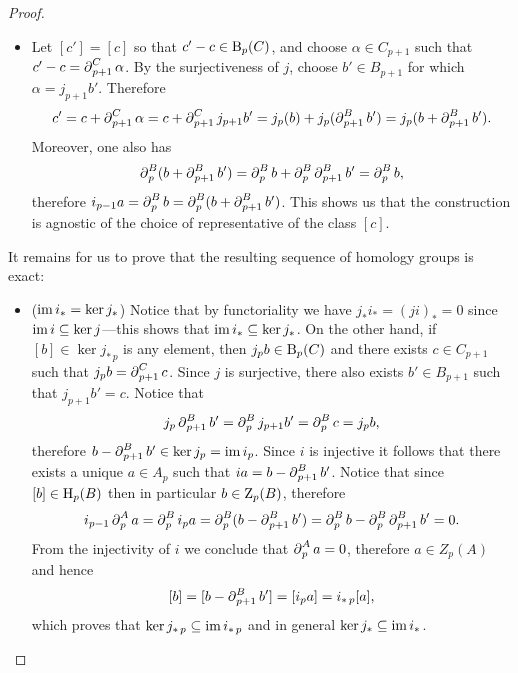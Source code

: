 \begin{proof}
\begin{itemize}
        \item Let \([c'] = [c]\) so that \(c' - c \in \operatorname{B}_p(C)\), and choose
              \(\alpha \in C_{p+1}\) such that \(c' - c = \operatorname{\partial}_{p+1}^C \alpha\). By the surjectiveness
              of \(j\), choose \(b' \in B_{p+1}\) for which \(\alpha = j_{p+1} b'\). Therefore
              \[
                  c' = c + \operatorname{\partial}_{p+1}^C \alpha = c + \operatorname{\partial}_{p+1}^C j_{p+1} b'
                  = j_p(b) + j_p(\operatorname{\partial}_{p+1}^B b')
                  = j_p(b + \operatorname{\partial}_{p+1}^B b').
              \]
              Moreover, one also has
              \[
                  \operatorname{\partial}_p^B(b + \operatorname{\partial}_{p+1}^B b')
                  = \operatorname{\partial}_p^B b + \operatorname{\partial}_p^B \operatorname{\partial}_{p+1}^B b'
                  = \operatorname{\partial}_p^{B} b,
              \]
              therefore \(i_{p-1} a = \operatorname{\partial}_p^B b = \operatorname{\partial}_p^B(b + \operatorname{\partial}_{p+1}^B b')\).  This
              shows us that the construction is agnostic of the choice of representative of
              the class \([c]\).
    \end{itemize}
    It remains for us to prove that the resulting sequence of homology groups is
    exact:
    \begin{itemize}\setlength\itemsep{0em}
        \item (\(\operatorname{im} i_{*} = \ker j_{*}\)) Notice that by functoriality we have
              \(j_{*} i_{*} = (j i)_{*} = 0\) since \(\operatorname{im} i \subseteq \ker j\)---this shows that
              \(\operatorname{im} i_{*} \subseteq \ker j_{*}\). On the other hand, if
              \([b] \in \ker j_{*\, p}\) is any element, then \(j_p b \in \operatorname{B}_p(C)\) and there
              exists \(c \in C_{p+1}\) such that \(j_p b = \operatorname{\partial}_{p+1}^C c\). Since \(j\) is
              surjective, there also exists \(b' \in B_{p+1}\) such that \(j_{p+1} b' =
              c\). Notice that
              \[
                  j_p\operatorname{\partial}_{p+1}^B b' = \operatorname{\partial}_p^B j_{p+1} b' = \operatorname{\partial}_p^B c = j_p b,
              \]
              therefore \(b - \operatorname{\partial}_{p+1}^B b' \in \ker j_p = \operatorname{im} i_p\). Since \(i\) is
              injective it follows that there exists a unique \(a \in A_p\) such that
              \(i a = b - \operatorname{\partial}_{p+1}^B b'\). Notice that since \([b] \in \operatorname{H}_p(B)\) then in
              particular \(b \in \operatorname{Z}_p(B)\), therefore
              \[
                  i_{p-1} \operatorname{\partial}_p^A a
                  = \operatorname{\partial}_p^B i_p a
                  =  \operatorname{\partial}_p^B(b - \operatorname{\partial}_{p+1}^B b')
                  = \operatorname{\partial}_p^B b - \operatorname{\partial}_p^B \operatorname{\partial}_{p+1}^B b'
                  = 0.
              \]
              From the injectivity of \(i\) we conclude that \(\operatorname{\partial}_p^A a = 0\), therefore
              \(a \in Z_p(A)\) and hence
              \[
                  [b] = [b - \operatorname{\partial}_{p+1}^B b'] = [i_p a] = i_{*\, p}[a],
              \]
              which proves that \(\ker j_{*\, p} \subseteq \operatorname{im} i_{*\, p}\) and in general
              \(\ker j_{*} \subseteq \operatorname{im} i_{*}\).


\end{itemize}
\end{proof}
